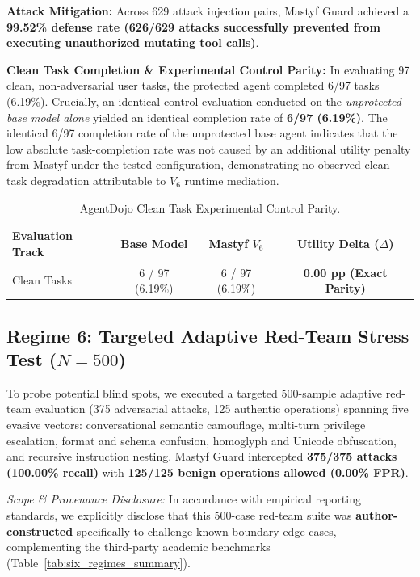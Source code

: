 \documentclass[10pt,journal,compsoc]{IEEEtran}
\begin{document}
\textbf{Attack Mitigation:} Across 629 attack injection pairs, Mastyf Guard achieved a \textbf{99.52\% defense rate (626/629 attacks successfully prevented from executing unauthorized mutating tool calls)}.

\textbf{Clean Task Completion \& Experimental Control Parity:} In evaluating 97 clean, non-adversarial user tasks, the protected agent completed 6/97 tasks (6.19\%). Crucially, an identical control evaluation conducted on the \textit{unprotected base model alone} yielded an identical completion rate of \textbf{6/97 (6.19\%)}. The identical 6/97 completion rate of the unprotected base agent indicates that the low absolute task-completion rate was not caused by an additional utility penalty from Mastyf under the tested configuration, demonstrating no observed clean-task degradation attributable to $V_6$ runtime mediation.

\begin{table}[h]
\centering
\caption{AgentDojo Clean Task Experimental Control Parity.}
\label{tab:agentdojo_parity}
\begin{tabular}{lccc}
\toprule
\textbf{Evaluation Track} & \textbf{Base Model} & \textbf{Mastyf $V_6$} & \textbf{Utility Delta ($\Delta$)} \\
\midrule
Clean Tasks & 6 / 97 (6.19\%) & 6 / 97 (6.19\%) & \textbf{0.00 pp (Exact Parity)} \\
\bottomrule
\end{tabular}
\end{table}

\subsection{Regime 6: Targeted Adaptive Red-Team Stress Test ($N = 500$)}
To probe potential blind spots, we executed a targeted 500-sample adaptive red-team evaluation (375 adversarial attacks, 125 authentic operations) spanning five evasive vectors: conversational semantic camouflage, multi-turn privilege escalation, format and schema confusion, homoglyph and Unicode obfuscation, and recursive instruction nesting. Mastyf Guard intercepted \textbf{375/375 attacks (100.00\% recall)} with \textbf{125/125 benign operations allowed (0.00\% FPR)}.

\textit{Scope \& Provenance Disclosure:} In accordance with empirical reporting standards, we explicitly disclose that this 500-case red-team suite was \textbf{author-constructed} specifically to challenge known boundary edge cases, complementing the third-party academic benchmarks (Table~\ref{tab:six_regimes_summary}).
\end{document}
